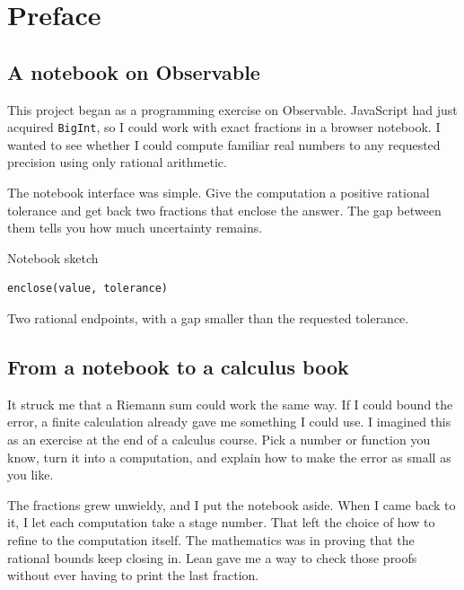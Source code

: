 \chapter*{Preface}
\label{ch:preface}



\section*{A notebook on Observable}
\label{preface:origins}


This project began as a programming exercise on Observable. JavaScript had just acquired \texttt{BigInt}, so I could work with exact fractions in a browser notebook. I wanted to see whether I could compute familiar real numbers to any requested precision using only rational arithmetic.


The notebook interface was simple. Give the computation a positive rational tolerance and get back two fractions that enclose the answer. The gap between them tells you how much uncertainty remains.




Notebook sketch


\begin{verbatim}
enclose(value, tolerance)
\end{verbatim}


Two rational endpoints, with a gap smaller than the requested tolerance.




\section*{From a notebook to a calculus book}
\label{preface:objects}


It struck me that a Riemann sum could work the same way. If I could bound the error, a finite calculation already gave me something I could use. I imagined this as an exercise at the end of a calculus course. Pick a number or function you know, turn it into a computation, and explain how to make the error as small as you like.


The fractions grew unwieldy, and I put the notebook aside. When I came back to it, I let each computation take a stage number. That left the choice of how to refine to the computation itself. The mathematics was in proving that the rational bounds keep closing in. Lean gave me a way to check those proofs without ever having to print the last fraction.



